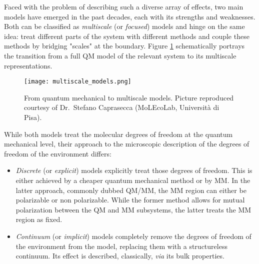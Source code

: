 Faced with the problem of describing such a diverse array of effects,
two main models have emerged in the past decades, each with its
strengths and weaknesses.
Both can be classified as \emph{multiscale} (or \emph{focused})
models\autocite{Nobel2013} and hinge on the same idea: treat different
parts of the system with different methods and couple these methods by
bridging "scales" at the boundary.
Figure \ref{fig:qm-to-multiscale} schematically portrays the transition
from a full \acrshort{QM} model of the relevant system to its multiscale
representations.

\begin{figure}[tb]
\centering
\texttt{[image: multiscale\_models.png]}
\caption[From quantum mechanical to multiscale models]{
From quantum mechanical to multiscale models. Picture reproduced
courtesy of Dr.~Stefano Caprasecca (MoLEcoLab, Università di Pisa).}
\label{fig:qm-to-multiscale}
\end{figure}

While both models treat the molecular degrees of freedom at the quantum
mechanical level, their approach to the microscopic description of the
degrees of freedom of the environment differs:
\begin{itemize}
 \item
   \emph{Discrete} (or \emph{explicit}) models explicitly treat those
   degrees of freedom.
   This is either achieved by a cheaper quantum mechanical
   method\autocite{Vreven2006-gx} or by \gls{MM}.\autocite{Senn2009-sk}
   In the latter approach, commonly dubbed \acrshort{QM}/\acrshort{MM}, the \acrshort{MM}
   region can either be polarizable\autocite{Mennucci2013-go,
   Olsen2010-wa, Lipparini2011-rd} or non
   polarizable. While the former method allows for mutual polarization
   between the \acrshort*{QM} and \acrshort*{MM} subsystems, the latter
   treats the \acrshort*{MM} region as fixed.
 \item
   \emph{Continuum} (or \emph{implicit}) models completely remove the degrees
   of freedom of the environment from the model, replacing them with a
   structureless continuum.
   Its effect is described, classically, \emph{via} its bulk
   properties.\autocite{Onsager1936-wf, Miertus1981-mm}
\end{itemize}

